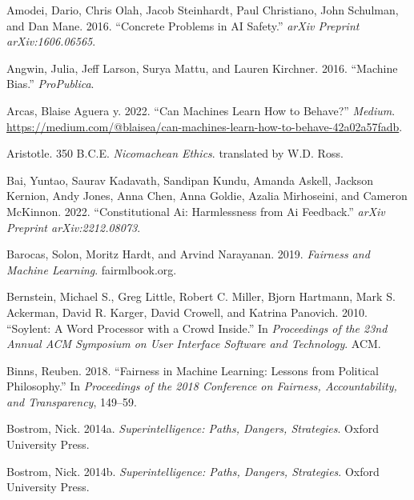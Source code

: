 \documentclass[
  letterpaper,
  DIV=11,
  numbers=noendperiod,
  oneside]{scrreprt}
\newlength{\cslhangindent}
\newenvironment{CSLReferences}[2] %
 {\begin{list}{}{%
  \setlength{\itemindent}{0pt}
  \setlength{\leftmargin}{0pt}
  \setlength{\parsep}{0pt}
  \ifodd #1
   \setlength{\leftmargin}{\cslhangindent}
   \setlength{\itemindent}{-1\cslhangindent}
  \fi
  \setlength{\itemsep}{#2\baselineskip}}}
 {\end{list}}
\theoremstyle{remark}
\begin{document}
\label{refs-6}
\begin{CSLReferences}{1}{0}
Amodei, Dario, Chris Olah, Jacob Steinhardt, Paul Christiano, John
Schulman, and Dan Mane. 2016. {``Concrete Problems in AI Safety.''}
\emph{arXiv Preprint arXiv:1606.06565}.

Angwin, Julia, Jeff Larson, Surya Mattu, and Lauren Kirchner. 2016.
{``Machine Bias.''} \emph{ProPublica}.

Arcas, Blaise Aguera y. 2022. {``Can Machines Learn How to Behave?''}
\emph{Medium}.
\url{https://medium.com/@blaisea/can-machines-learn-how-to-behave-42a02a57fadb}.

Aristotle. 350 B.C.E. \emph{Nicomachean Ethics}. translated by W.D.
Ross.

Bai, Yuntao, Saurav Kadavath, Sandipan Kundu, Amanda Askell, Jackson
Kernion, Andy Jones, Anna Chen, Anna Goldie, Azalia Mirhoseini, and
Cameron McKinnon. 2022. {``Constitutional Ai: {Harmlessness} from Ai
Feedback.''} \emph{arXiv Preprint arXiv:2212.08073}.

Barocas, Solon, Moritz Hardt, and Arvind Narayanan. 2019. \emph{Fairness
and Machine Learning}. fairmlbook.org.

Bernstein, Michael S., Greg Little, Robert C. Miller, Bjorn Hartmann,
Mark S. Ackerman, David R. Karger, David Crowell, and Katrina Panovich.
2010. {``Soylent: A Word Processor with a Crowd Inside.''} In
\emph{Proceedings of the 23nd Annual ACM Symposium on User Interface
Software and Technology}. ACM.

Binns, Reuben. 2018. {``Fairness in Machine Learning: Lessons from
Political Philosophy.''} In \emph{Proceedings of the 2018 Conference on
Fairness, Accountability, and Transparency}, 149--59.

Bostrom, Nick. 2014a. \emph{Superintelligence: Paths, Dangers,
Strategies}. Oxford University Press.

Bostrom, Nick. 2014b. \emph{Superintelligence: Paths, Dangers,
Strategies}. Oxford University Press.


\end{CSLReferences}
\end{document}

